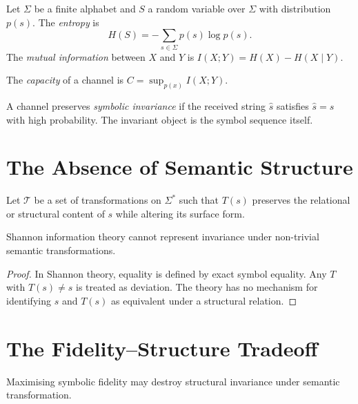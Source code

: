 \documentclass[11pt,openany]{book}
\begin{document}
Let $\Sigma$ be a finite alphabet and $S$ a random variable
over $\Sigma$ with distribution $p(s)$. The
\emph{entropy} is
\[
  H(S) = -\sum_{s \in \Sigma} p(s) \log p(s).
\]
The \emph{mutual information} between $X$ and $Y$ is
$I(X;Y) = H(X) - H(X \mid Y)$.

\begin{definition}
The \emph{capacity} of a channel is
$C = \sup_{p(x)} I(X;Y)$.
\end{definition}

\begin{definition}
A channel preserves \emph{symbolic invariance} if the
received string $\hat{s}$ satisfies $\hat{s} = s$ with high
probability. The invariant object is the symbol sequence
itself.
\end{definition}

\section{The Absence of Semantic Structure}
\label{sec:semantics}

\begin{definition}
Let $\mathcal{T}$ be a set of transformations on $\Sigma^*$
such that $T(s)$ preserves the relational or structural
content of $s$ while altering its surface form.
\end{definition}

\begin{proposition}
\label{prop:semantic}
Shannon information theory cannot represent invariance under
non-trivial semantic transformations.
\end{proposition}

\begin{proof}
In Shannon theory, equality is defined by exact symbol
equality. Any $T$ with $T(s) \neq s$ is treated as
deviation. The theory has no mechanism for identifying $s$
and $T(s)$ as equivalent under a structural relation.
\end{proof}

\section{The Fidelity--Structure Tradeoff}
\label{sec:cost-fidelity}

\begin{proposition}
Maximising symbolic fidelity may destroy structural
invariance under semantic transformation.
\end{proposition}
\end{document}
